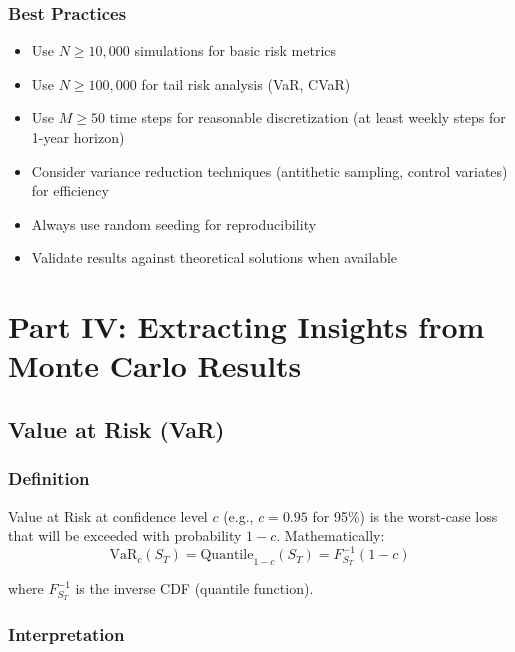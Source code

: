 \documentclass[12pt,a4paper]{article}
\begin{document}
\subsubsection{Best Practices}

\begin{tcolorbox}[colback=purple!10, colframe=purple!50, title=Recommendations for Monte Carlo]
\begin{itemize}
    \item Use $N \geq 10,000$ simulations for basic risk metrics
    \item Use $N \geq 100,000$ for tail risk analysis (VaR, CVaR)
    \item Use $M \geq 50$ time steps for reasonable discretization (at least weekly steps for 1-year horizon)
    \item Consider variance reduction techniques (antithetic sampling, control variates) for efficiency
    \item Always use random seeding for reproducibility
    \item Validate results against theoretical solutions when available
\end{itemize}
\end{tcolorbox}

\newpage

\section{Part IV: Extracting Insights from Monte Carlo Results}

\subsection{Value at Risk (VaR)}

\subsubsection{Definition}

Value at Risk at confidence level $c$ (e.g., $c = 0.95$ for 95\%) is the worst-case loss that will be exceeded with probability $1-c$. Mathematically:
\begin{equation}
\text{VaR}_c(S_T) = \text{Quantile}_{1-c}(S_T) = F_{S_T}^{-1}(1-c)
\end{equation}

where $F_{S_T}^{-1}$ is the inverse CDF (quantile function).

\subsubsection{Interpretation}
\end{document}
